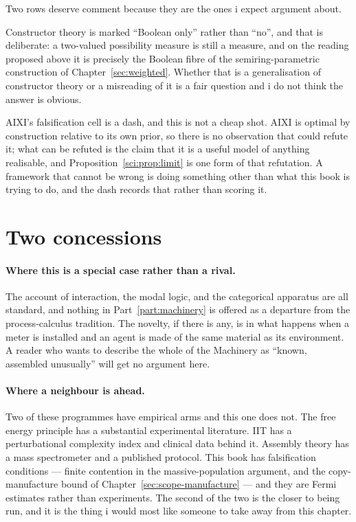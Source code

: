 Two rows deserve comment because they are the ones i expect
argument about.

Constructor theory is marked ``Boolean only'' rather than
``no'', and that is deliberate: a two-valued possibility measure is
still a measure, and on the reading proposed above it is precisely
the Boolean fibre of the semiring-parametric construction of
Chapter~\ref{sec:weighted}.
Whether that is a generalisation of constructor theory or a
misreading of it is a fair question and i do not think the answer
is obvious.

AIXI's falsification cell is a dash, and this is not a cheap shot.
AIXI is optimal by construction relative to its own prior, so there
is no observation that could refute it; what can be refuted is the
claim that it is a useful model of anything realisable, and
Proposition~\ref{sci:prop:limit} is one form of that refutation.
A framework that cannot be wrong is doing something other than what
this book is trying to do, and the dash records that rather than
scoring it.

\section*{Two concessions}

\paragraph{Where this is a special case rather than a rival.}
The account of interaction, the modal logic, and the categorical
apparatus are all standard, and nothing in
Part~\ref{part:machinery} is offered as a departure from the
process-calculus tradition.
The novelty, if there is any, is in what happens when a meter is
installed and an agent is made of the same material as its
environment.
A reader who wants to describe the whole of the Machinery as
``known, assembled unusually'' will get no argument here.

\paragraph{Where a neighbour is ahead.}
Two of these programmes have empirical arms and this one does not.
The free energy principle has a substantial experimental
literature.
IIT has a perturbational complexity index and clinical data behind
it.
Assembly theory has a mass spectrometer and a published protocol.
This book has falsification conditions --- finite contention in the
massive-population argument, and the copy-manufacture bound of
Chapter~\ref{sec:scope-manufacture} --- and they are Fermi
estimates rather than experiments.
The second of the two is the closer to being run, and it is the
thing i would most like someone to take away from this chapter.

\renewcommand{\thetable}{\thechapter.\arabic{table}}\setcounter{table}{0}
